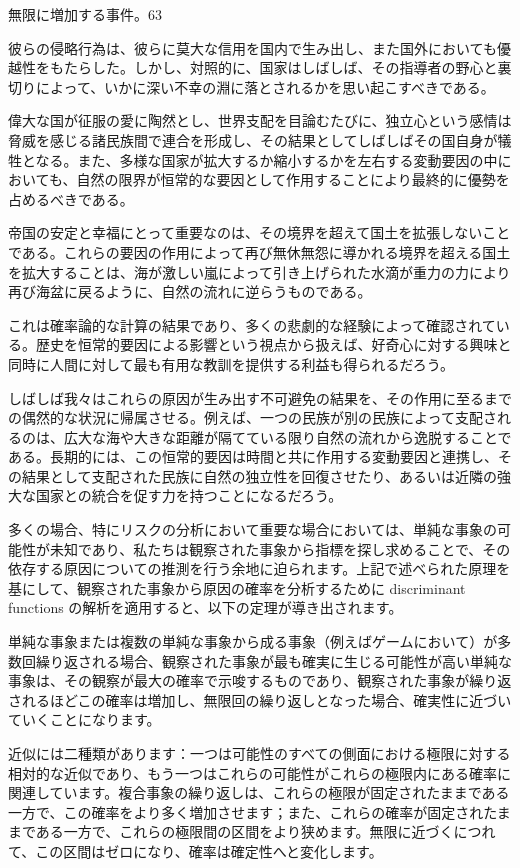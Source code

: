 \documentclass[a4paper,11pt,openany]{ltjsbook}
\begin{document}
無限に増加する事件。63

彼らの侵略行為は、彼らに莫大な信用を国内で生み出し、また国外においても優越性をもたらした。しかし、対照的に、国家はしばしば、その指導者の野心と裏切りによって、いかに深い不幸の淵に落とされるかを思い起こすべきである。

偉大な国が征服の愛に陶然とし、世界支配を目論むたびに、独立心という感情は脅威を感じる諸民族間で連合を形成し、その結果としてしばしばその国自身が犠牲となる。また、多様な国家が拡大するか縮小するかを左右する変動要因の中においても、自然の限界が恒常的な要因として作用することにより最終的に優勢を占めるべきである。

帝国の安定と幸福にとって重要なのは、その境界を超えて国土を拡張しないことである。これらの要因の作用によって再び無休無怨に導かれる境界を超える国土を拡大することは、海が激しい嵐によって引き上げられた水滴が重力の力により再び海盆に戻るように、自然の流れに逆らうものである。

これは確率論的な計算の結果であり、多くの悲劇的な経験によって確認されている。歴史を恒常的要因による影響という視点から扱えば、好奇心に対する興味と同時に人間に対して最も有用な教訓を提供する利益も得られるだろう。

しばしば我々はこれらの原因が生み出す不可避免の結果を、その作用に至るまでの偶然的な状況に帰属させる。例えば、一つの民族が別の民族によって支配されるのは、広大な海や大きな距離が隔てている限り自然の流れから逸脱することである。長期的には、この恒常的要因は時間と共に作用する変動要因と連携し、その結果として支配された民族に自然の独立性を回復させたり、あるいは近隣の強大な国家との統合を促す力を持つことになるだろう。

多くの場合、特にリスクの分析において重要な場合においては、単純な事象の可能性が未知であり、私たちは観察された事象から指標を探し求めることで、その依存する原因についての推測を行う余地に迫られます。上記で述べられた原理を基にして、観察された事象から原因の確率を分析するために discriminant functions の解析を適用すると、以下の定理が導き出されます。

単純な事象または複数の単純な事象から成る事象（例えばゲームにおいて）が多数回繰り返される場合、観察された事象が最も確実に生じる可能性が高い単純な事象は、その観察が最大の確率で示唆するものであり、観察された事象が繰り返されるほどこの確率は増加し、無限回の繰り返しとなった場合、確実性に近づいていくことになります。

近似には二種類があります：一つは可能性のすべての側面における極限に対する相対的な近似であり、もう一つはこれらの可能性がこれらの極限内にある確率に関連しています。複合事象の繰り返しは、これらの極限が固定されたままである一方で、この確率をより多く増加させます；また、これらの確率が固定されたままである一方で、これらの極限間の区間をより狭めます。無限に近づくにつれて、この区間はゼロになり、確率は確定性へと変化します。
\end{document}
